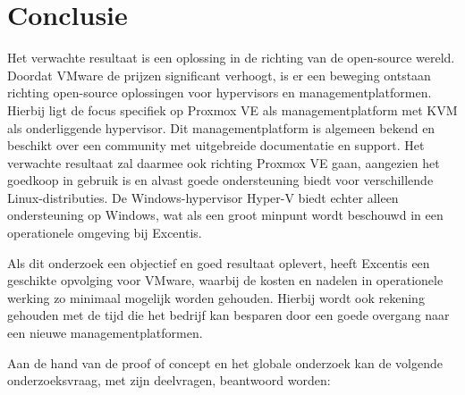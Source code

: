 
\chapter{Conclusie}%
\label{ch:conclusie}


Het verwachte resultaat is een oplossing in de richting van de open-source wereld. Doordat VMware de prijzen significant verhoogt, is er een beweging ontstaan richting open-source oplossingen voor hypervisors en managementplatformen.
Hierbij ligt de focus specifiek op Proxmox VE als managementplatform met KVM als onderliggende hypervisor. Dit managementplatform is algemeen bekend en beschikt over een community met uitgebreide documentatie en support.
Het verwachte resultaat zal daarmee ook richting Proxmox VE gaan, aangezien het goedkoop in gebruik is en alvast goede ondersteuning biedt voor verschillende Linux-distributies.
De Windows-hypervisor Hyper-V biedt echter alleen ondersteuning op Windows, wat als een groot minpunt wordt beschouwd in een operationele omgeving bij Excentis.

Als dit onderzoek een objectief en goed resultaat oplevert, heeft Excentis een geschikte opvolging voor VMware, waarbij de kosten en nadelen in operationele werking zo minimaal mogelijk worden gehouden.
Hierbij wordt ook rekening gehouden met de tijd die het bedrijf kan besparen door een goede overgang naar een nieuwe managementplatformen.

Aan de hand van de proof of concept en het globale onderzoek kan de volgende onderzoeksvraag, met zijn deelvragen, beantwoord worden:
